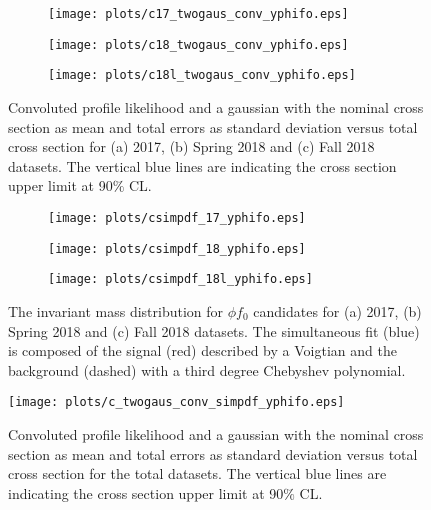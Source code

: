 \begin{figure}[htbp]
    \centering
    \begin{subfigure}[b]{0.49\textwidth}
        \texttt{[image: plots/c17\_twogaus\_conv\_yphifo.eps]}
        \caption{}
        \label{fig.xsec_ul.yphifo.2.a}
    \end{subfigure}
    \begin{subfigure}[b]{0.49\textwidth}
        \texttt{[image: plots/c18\_twogaus\_conv\_yphifo.eps]}
        \caption{}
        \label{fig.xsec_ul.yphifo.2.b}
    \end{subfigure}
    \begin{subfigure}[b]{0.49\textwidth}
        \texttt{[image: plots/c18l\_twogaus\_conv\_yphifo.eps]}
        \caption{}
        \label{fig.xsec_ul.yphifo.2.c}
    \end{subfigure}
    \caption{Convoluted profile likelihood and a gaussian with the nominal cross section as mean and total errors as standard deviation versus total cross section for (a) 2017, (b) Spring 2018 and (c) Fall 2018 datasets. The vertical blue lines are indicating the cross section upper limit at 90$\%$ CL.}
    \label{fig.xsec_ul.yphifo.2}
\end{figure}

\begin{figure}[htbp]
    \centering
    \begin{subfigure}[b]{0.49\textwidth}
        \texttt{[image: plots/csimpdf\_17\_yphifo.eps]}
        \caption{}
        \label{fig.xsec_ul.yphifo.3.a}
    \end{subfigure}
    \begin{subfigure}[b]{0.49\textwidth}
        \texttt{[image: plots/csimpdf\_18\_yphifo.eps]}
        \caption{}
        \label{fig.xsec_ul.yphifo.3.b}
    \end{subfigure}
    \begin{subfigure}[b]{0.49\textwidth}
        \texttt{[image: plots/csimpdf\_18l\_yphifo.eps]}
        \caption{}
        \label{fig.xsec_ul.yphifo.3.c}
    \end{subfigure}
    \caption{The invariant mass distribution for $\phi f_0$ candidates for (a) 2017, (b) Spring 2018 and (c) Fall 2018 datasets. The simultaneous fit (blue) is composed of the signal (red) described by a Voigtian and the background (dashed) with a third degree Chebyshev polynomial.}
    \label{fig.xsec_ul.yphifo.3}
\end{figure}

\begin{figure}[htbp]
    \centering
    \texttt{[image: plots/c\_twogaus\_conv\_simpdf\_yphifo.eps]}
    \caption{\label{fig.xsec_ul.yphifo.4}Convoluted profile likelihood and a gaussian with the nominal cross section as mean and total errors as standard deviation versus total cross section for the total datasets. The vertical blue lines are indicating the cross section upper limit at 90$\%$ CL.}
\end{figure}